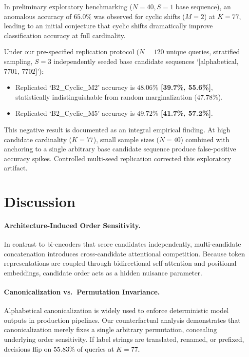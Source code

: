 \documentclass[11pt,a4paper]{article}
\begin{document}
In preliminary exploratory benchmarking ($N=40, S=1$ base sequence), an anomalous accuracy of \textbf{$65.0\%$} was observed for cyclic shifts ($M=2$) at $K=77$, leading to an initial conjecture that cyclic shifts dramatically improve classification accuracy at full cardinality.

Under our pre-specified replication protocol ($N=120$ unique queries, stratified sampling, $S=3$ independently seeded base candidate sequences `[alphabetical, 7701, 7702]'):
\begin{itemize}
    \item Replicated `B2\_Cyclic\_M2' accuracy is \textbf{$48.06\%$ [39.7\%, 55.6\%]}, statistically indistinguishable from random marginalization ($47.78\%$).
    \item Replicated `B2\_Cyclic\_M5' accuracy is \textbf{$49.72\%$ [41.7\%, 57.2\%]}.
\end{itemize}
This negative result is documented as an integral empirical finding. At high candidate cardinality ($K=77$), small sample sizes ($N=40$) combined with anchoring to a single arbitrary base candidate sequence produce false-positive accuracy spikes. Controlled multi-seed replication corrected this exploratory artifact.

\section{Discussion}

\paragraph{Architecture-Induced Order Sensitivity.}
In contrast to bi-encoders that score candidates independently, multi-candidate concatenation introduces cross-candidate attentional competition. Because token representations are coupled through bidirectional self-attention and positional embeddings, candidate order acts as a hidden nuisance parameter.

\paragraph{Canonicalization vs.\ Permutation Invariance.}
Alphabetical canonicalization is widely used to enforce deterministic model outputs in production pipelines. Our counterfactual analysis demonstrates that canonicalization merely fixes a single arbitrary permutation, concealing underlying order sensitivity. If label strings are translated, renamed, or prefixed, decisions flip on $55.83\%$ of queries at $K=77$.
\end{document}
